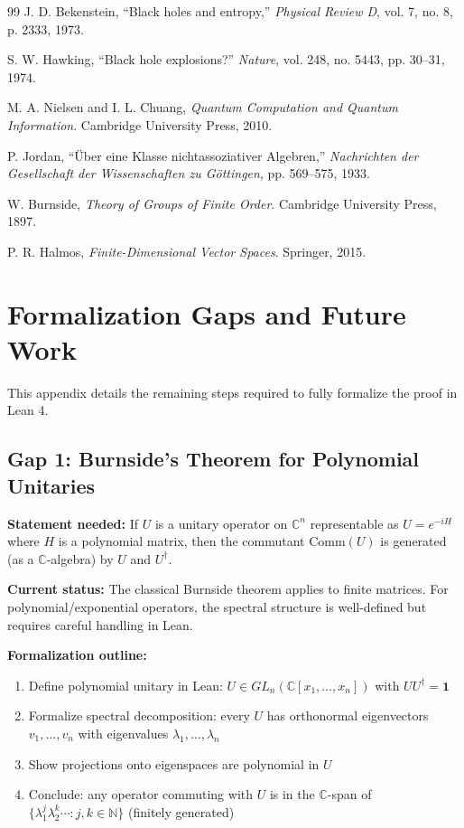 \documentclass[11pt,a4paper]{article}
\theoremstyle{plain}
\theoremstyle{definition}
\newcommand{\CC}{\mathbb{C}}
\newcommand{\NN}{\mathbb{N}}
\newcommand{\Com}[1]{\mathrm{Comm}(#1)}
\newcommand{\Id}{\mathbf{1}}
\begin{document}
\begin{thebibliography}{99}
 J. D. Bekenstein, ``Black holes and entropy,'' \textit{Physical Review D}, vol. 7, no. 8, p. 2333, 1973.

 S. W. Hawking, ``Black hole explosions?'' \textit{Nature}, vol. 248, no. 5443, pp. 30--31, 1974.

 M. A. Nielsen and I. L. Chuang, \textit{Quantum Computation and Quantum Information}. Cambridge University Press, 2010.

 P. Jordan, ``Über eine Klasse nichtassoziativer Algebren,'' \textit{Nachrichten der Gesellschaft der Wissenschaften zu Göttingen}, pp. 569--575, 1933.

 W. Burnside, \textit{Theory of Groups of Finite Order}. Cambridge University Press, 1897.

 P. R. Halmos, \textit{Finite-Dimensional Vector Spaces}. Springer, 2015.

\end{thebibliography}

\appendix

\section{Formalization Gaps and Future Work}
\label{app:formalization-gaps}

This appendix details the remaining steps required to fully formalize the proof in Lean 4.

\subsection{Gap 1: Burnside's Theorem for Polynomial Unitaries}

\textbf{Statement needed:} If $U$ is a unitary operator on $\CC^n$ representable as $U = e^{-iH}$ where $H$ is a polynomial matrix, then the commutant $\Com{U}$ is generated (as a $\CC$-algebra) by $U$ and $U^\dagger$.

\textbf{Current status:} The classical Burnside theorem applies to finite matrices. For polynomial/exponential operators, the spectral structure is well-defined but requires careful handling in Lean.

\textbf{Formalization outline:}
\begin{enumerate}
\item Define polynomial unitary in Lean: $U \in GL_n(\CC[x_1, \ldots, x_n])$ with $UU^\dagger = \Id$
\item Formalize spectral decomposition: every $U$ has orthonormal eigenvectors $v_1, \ldots, v_n$ with eigenvalues $\lambda_1, \ldots, \lambda_n$
\item Show projections onto eigenspaces are polynomial in $U$
\item Conclude: any operator commuting with $U$ is in the $\CC$-span of $\{\lambda_1^j \lambda_2^k \cdots : j,k \in \NN\}$ (finitely generated)
\end{enumerate}
\end{document}
